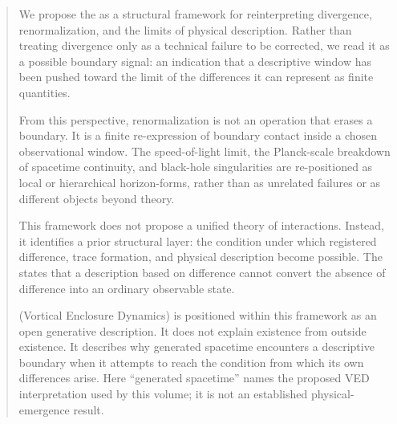 \begin{abstract}

We propose the \DH{} as a structural framework for reinterpreting
divergence, renormalization, and the limits of physical description.
Rather than treating divergence only as a technical failure to be corrected,
we read it as a possible boundary signal:
an indication that a descriptive window has been pushed toward the limit
of the differences it can represent as finite quantities.

From this perspective,
renormalization is not an operation that erases a boundary.
It is a finite re-expression of boundary contact inside a chosen
observational window.
The speed-of-light limit,
the Planck-scale breakdown of spacetime continuity,
and black-hole singularities are re-positioned as local or hierarchical
horizon-forms,
rather than as unrelated failures or as different objects beyond theory.

This framework does not propose a unified theory of interactions.
Instead,
it identifies a prior structural layer:
the condition under which registered difference,
trace formation,
and physical description become possible.
The \DHP{} states that a description based on difference cannot convert
the absence of difference into an ordinary observable state.

\VED{} (Vortical Enclosure Dynamics) is positioned within this framework
as an open generative description.
It does not explain existence from outside existence.
It describes why generated spacetime encounters a descriptive boundary
when it attempts to reach the condition from which its own differences arise.
Here ``generated spacetime'' names the proposed VED interpretation used by
this volume; it is not an established physical-emergence result.

\end{abstract}
